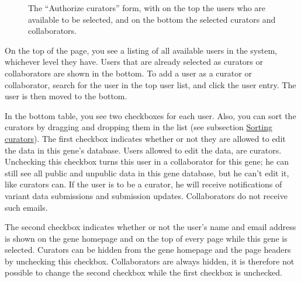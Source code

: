 \documentclass[a4paper,oneside,openany,12pt]{memoir}
\begin{document}
\begin{figure}[ht]
  \begin{shaded}
  \caption{%
    The ``Authorize curators'' form, with on the top the users who are available to be selected, and on the bottom the selected curators and collaborators.}
  \label{fig:c05s05_screenshot_authorize_curators}
  \end{shaded}
\end{figure}

On the top of the page, you see a listing of all available users in the system, whichever level they have.
Users that are already selected as curators or collaborators are shown in the bottom.
To add a user as a curator or collaborator, search for the user in the top user list, and click the user entry.
The user is then moved to the bottom.
\par
In the bottom table, you see two checkboxes for each user.
Also, you can sort the curators by dragging and dropping them in the list (see subsection \hyperlink{ssec:sorting_curators}{Sorting curators}).
The first checkbox indicates whether or not they are allowed to edit the data in this gene's database.
Users allowed to edit the data, are curators.
Unchecking this checkbox turns this user in a collaborator for this gene;
 he can still see all public and unpublic data in this gene database, but he can't edit it, like curators can.
If the user is to be a curator, he will receive notifications of variant data submissions and submission updates.
Collaborators do not receive such emails.

The second checkbox indicates whether or not the user's name and email address is
 shown on the gene homepage and on the top of every page while this gene is selected.
Curators can be hidden from the gene homepage and the page headers by unchecking this checkbox.
Collaborators are always hidden, it is therefore not possible to change the second checkbox while the first checkbox is unchecked.
\end{document}
